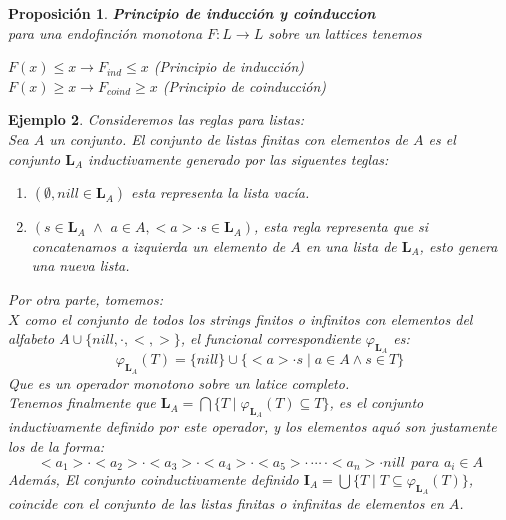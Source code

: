 \documentclass[executivepaper]{article}
\newtheorem{propo}{Proposición}[section]
\newtheorem{ejemplo}[propo]{Ejemplo}
\begin{document}
\begin{propo}\textbf{Principio de inducción y coinduccion}\\
    para una endofinción monotona $F:L\rightarrow L$ sobre un lattices tenemos
    \begin{center}
        $F(x)\leq x \rightarrow F_{ind}\leq x$ (Principio de inducción)\\
        $F(x)\geq x \rightarrow F_{coind}\geq x$ (Principio de coinducción)
    \end{center}
\end{propo}

\begin{ejemplo}
    Consideremos las reglas para listas:\\
    Sea $A$ un conjunto. El conjunto de listas finitas con elementos de $A$ es el conjunto $\mathbf{L}_A$ inductivamente generado por las siguentes teglas:
    \begin{enumerate}
        \item $(\emptyset,nill \in \mathbf{L}_A)$ esta representa la lista vacía.
        \item $(s \in \mathbf{L}_A\,\,\land\,\, a\in A, <a>\cdot s \in \mathbf{L}_A)$, esta regla representa que si concatenamos a izquierda un elemento de $A$ en una lista de $\mathbf{L}_A$, esto genera una nueva lista.
    \end{enumerate}
    Por otra parte, tomemos:\\ 
    $X$ como el conjunto de todos los strings finitos o infinitos con elementos del alfabeto $A\cup\{nill, \cdot, <, >\}$, el funcional correspondiente $\varphi_{\mathbf{L}_A}$ es:
    $$\varphi_{\mathbf{L}_A}(T) = \{nill\} \cup \{<a>\cdot s \mid a\in A \land s \in T \}$$
    Que es un operador monotono sobre un latice completo.\\
    Tenemos finalmente que $\mathbf{L}_A = \bigcap \{T \mid \varphi_{\mathbf{L}_A}(T)\subseteq T\}$, es el conjunto inductivamente definido por este operador, y los elementos aquó son justamente los de la forma:\\
    $$<a_1>\cdot<a_2>\cdot<a_3>\cdot<a_4>\cdot<a_5>\cdot\,\cdots\,\cdot <a_n> \cdot nill\:\: para\,\, a_i \in A$$
    Además, El conjunto coinductivamente definido $\mathbf{{I}}_A = \bigcup \{T \mid T\subseteq\varphi_{\mathbf{L}_A}(T)\}$, coincide con el conjunto de las listas finitas o infinitas de elementos en $A$.
\end{ejemplo}
\end{document}
